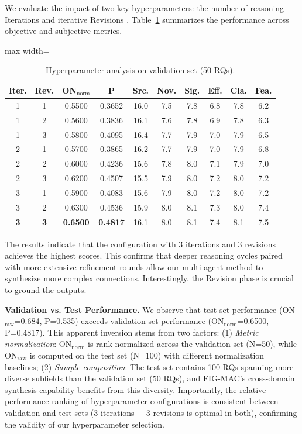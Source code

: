 \documentclass[runningheads]{llncs}
\begin{document}
We evaluate the impact of two key hyperparameters: the number of reasoning Iterations and iterative Revisions . Table~\ref{tab:hyperparam_results} summarizes the performance across objective and subjective metrics.

\begin{table}[t]
\centering
\small
\caption{Hyperparameter analysis on validation set (50 RQs).}
\label{tab:hyperparam_results}
\begin{adjustbox}{max width=\textwidth}
\begin{tabular}{cccccccccc}
\toprule
\textbf{Iter.} & \textbf{Rev.} & \textbf{ON$_{\text{norm}}$} & \textbf{P} & \textbf{Src.} & \textbf{Nov.} & \textbf{Sig.} & \textbf{Eff.} & \textbf{Cla.} & \textbf{Fea.} \\
\midrule
1 & 1 & 0.5500 & 0.3652 & 16.0 & 7.5 & 7.8 & 6.8 & 7.8 & 6.2 \\
1 & 2 & 0.5600 & 0.3836 & 16.1 & 7.6 & 7.8 & 6.9 & 7.8 & 6.3 \\
1 & 3 & 0.5800 & 0.4095 & 16.4 & 7.7 & 7.9 & 7.0 & 7.9 & 6.5 \\
2 & 1 & 0.5700 & 0.3865 & 16.2 & 7.7 & 7.9 & 7.0 & 7.9 & 6.8 \\
2 & 2 & 0.6000 & 0.4236 & 15.6 & 7.8 & 8.0 & 7.1 & 7.9 & 7.0 \\
2 & 3 & 0.6200 & 0.4507 & 15.5 & 7.9 & 8.0 & 7.2 & 8.0 & 7.2 \\
3 & 1 & 0.5900 & 0.4083 & 15.6 & 7.9 & 8.0 & 7.2 & 8.0 & 7.2 \\
3 & 2 & 0.6300 & 0.4536 & 15.9 & 8.0 & 8.1 & 7.3 & 8.0 & 7.4 \\
\textbf{3} & \textbf{3} & \textbf{0.6500} & \textbf{0.4817} & 16.1 & 8.0 & 8.1 & 7.4 & 8.1 & 7.5 \\
\bottomrule
\end{tabular}
\end{adjustbox}
\end{table}

The results indicate that the configuration with 3 iterations and 3 revisions achieves the highest scores. This confirms that deeper reasoning cycles paired with more extensive refinement rounds allow our multi-agent method to synthesize more complex connections. Interestingly, the Revision phase is crucial to ground the outputs.

\textbf{Validation vs. Test Performance.} We observe that test set performance (ON$_{\text{raw}}$=0.684, P=0.535) exceeds validation set performance (ON$_{\text{norm}}$=0.6500, P=0.4817). This apparent inversion stems from two factors: (1) \textit{Metric normalization}: ON$_{\text{norm}}$ is rank-normalized across the validation set (N=50), while ON$_{\text{raw}}$ is computed on the test set (N=100) with different normalization baselines; (2) \textit{Sample composition}: The test set contains 100 RQs spanning more diverse subfields than the validation set (50 RQs), and FIG-MAC's cross-domain synthesis capability benefits from this diversity. Importantly, the relative performance ranking of hyperparameter configurations is consistent between validation and test sets (3 iterations + 3 revisions is optimal in both), confirming the validity of our hyperparameter selection.
\end{document}
